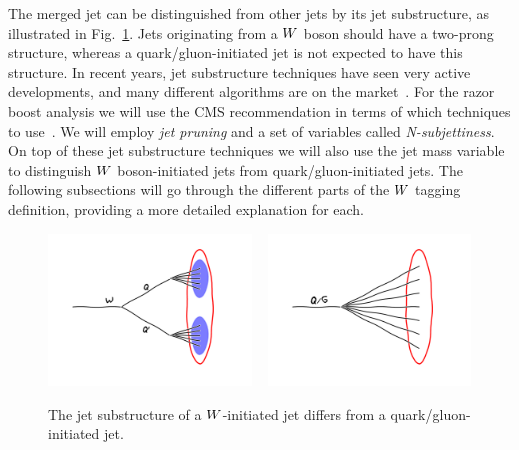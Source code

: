 The merged jet can be distinguished from other jets by its jet substructure, as illustrated in
Fig.~\ref{fig:boost_wtag_cartoon}. Jets originating from a $W$ boson should have a two-prong
structure, whereas a quark/gluon-initiated jet is not expected to have this structure. 
In recent years, jet substructure techniques have seen very active developments, and many different
algorithms are on the market~\cite{Krohn:2009th,Gallicchio:2010sw,Butterworth:2008iy,Kaplan:2008ie}.
For the razor boost analysis we will use the CMS recommendation
in terms of which techniques to use~\cite{CMS-PAS-JME-13-006,Khachatryan:2014vla}. We will employ
\textit{jet pruning} and a set of variables called \textit{N-subjettiness}. On top of these jet
substructure techniques we will also use the jet mass variable to distinguish $W$ boson-initiated
jets
from quark/gluon-initiated jets. 
The following subsections will go through the different parts of the
$W$ tagging definition, providing a more detailed explanation for each.

\begin{figure}
  \centering
  \includegraphics[width=0.48\textwidth]{figures/razor_wtag/W_subjets}
  ~
  \includegraphics[width=0.48\textwidth]{figures/razor_wtag/qg_jets}
  \caption{The jet substructure of a $W$-initiated jet differs from a quark/gluon-initiated jet.
  \label{fig:boost_wtag_cartoon}}
\end{figure}


